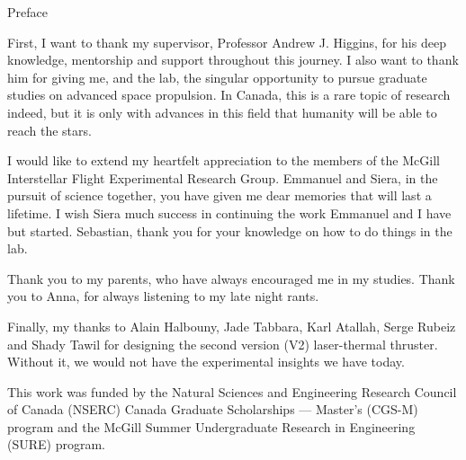 \begin{plainchp}{Preface}
    \setcounter{page}{1}

    First, I want to thank my supervisor, Professor Andrew J. Higgins, for his deep knowledge, mentorship and support throughout this journey. I also want to thank him for giving me, and the lab, the singular opportunity to pursue graduate studies on advanced space propulsion. In Canada, this is a rare topic of research indeed, but it is only with advances in this field that humanity will be able to reach the stars.

    I would like to extend my heartfelt appreciation to the members of the McGill Interstellar Flight Experimental Research Group. Emmanuel and Siera, in the pursuit of science together, you have given me dear memories that will last a lifetime. I wish Siera much success in continuing the work Emmanuel and I have but started. Sebastian, thank you for your knowledge on how to do things in the lab.
    
    Thank you to my parents, who have always encouraged me in my studies. Thank you to Anna, for always listening to my late night rants.

    Finally, my thanks to Alain Halbouny, Jade Tabbara, Karl Atallah, Serge Rubeiz and Shady Tawil for designing the second version (V2) laser-thermal thruster. Without it, we would not have the experimental insights we have today.
    

    This work was funded by the Natural Sciences and Engineering Research Council of Canada (NSERC) Canada Graduate Scholarships — Master’s (CGS-M) program and the McGill Summer Undergraduate Research in Engineering (SURE) program.

\end{plainchp}